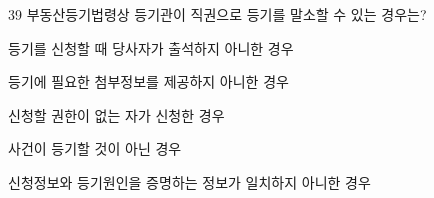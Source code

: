 \begin{question}{39}
부동산등기법령상 등기관이 직권으로 등기를 말소할 수 있는 경우는?
\begin{choices}
  \item 등기를 신청할 때 당사자가 출석하지 아니한 경우
  \item 등기에 필요한 첨부정보를 제공하지 아니한 경우
  \item 신청할 권한이 없는 자가 신청한 경우
  \item 사건이 등기할 것이 아닌 경우
  \item 신청정보와 등기원인을 증명하는 정보가 일치하지 아니한 경우
\end{choices}
\end{question}
